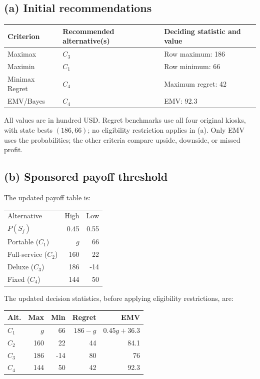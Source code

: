 \subsection*{(a) Initial recommendations }
\begin{center}
\begin{tabular}{lll}\toprule
Criterion & Recommended alternative(s) & Deciding statistic and value\\ \midrule
		Maximax & $C_3$ & Row maximum: 186\\
		Maximin & $C_1$ & Row minimum: 66\\
		Minimax Regret & $C_4$ & Maximum regret: 42\\
		EMV/Bayes & $C_4$ & EMV: 92.3\\
		\bottomrule\end{tabular}
\end{center}
All values are in hundred USD. Regret benchmarks use all four original kiosks, with state bests $(186,66)$; no eligibility restriction applies in (a). Only EMV uses the probabilities; the other criteria compare upside, downside, or missed profit.
\secInicio[sec:q2]



\label{sol:q2b}
\subsection*{(b) Sponsored payoff threshold }

The updated payoff table is:

\begin{center}\small\setlength{\tabcolsep}{4pt}
	\begin{tabular}{lrr}\toprule
		Alternative & High & Low\\
		$P(S_j)$ & 0.45 & 0.55\\ \midrule
				Portable ($C_1$) & $g$ & 66\\
		Full-service ($C_2$) & 160 & 22\\
		Deluxe ($C_3$) & 186 & -14\\
		Fixed ($C_4$) & 144 & 50\\
		\bottomrule
	\end{tabular}
\end{center}

The updated decision statistics, before applying
eligibility restrictions, are:

\begin{center}\small\setlength{\tabcolsep}{4pt}
	\begin{tabular}{lrrrr}\toprule
		Alt. & Max & Min & Regret & EMV\\ \midrule
				$C_1$ & $g$ & 66 & $186-g$ & $0.45g+36.3$\\
		$C_2$ & 160 & 22 & 44 & 84.1\\
		$C_3$ & 186 & -14 & 80 & 76\\
		$C_4$ & 144 & 50 & 42 & 92.3\\
		\bottomrule
	\end{tabular}
\end{center}

